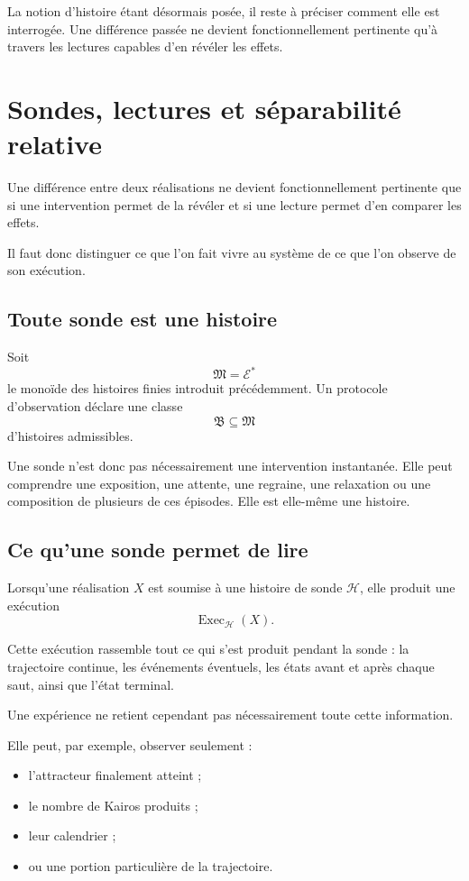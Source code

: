 La notion d'histoire étant désormais posée, il reste à préciser comment elle est interrogée. Une différence passée ne devient fonctionnellement pertinente qu'à travers les lectures capables d'en révéler les effets.

\section{Sondes, lectures et séparabilité relative}
\label{t3-sondes-lectures-separabilite}

Une différence entre deux réalisations ne devient fonctionnellement pertinente que si une intervention permet de la révéler et si une lecture permet d'en comparer les effets.

Il faut donc distinguer ce que l'on fait vivre au système de ce que l'on observe de son exécution.

\subsection{Toute sonde est une histoire}

Soit
\[
\mathfrak M=\mathcal E^\ast
\]
le monoïde des histoires finies introduit précédemment. Un protocole d'observation déclare une classe
\[
\mathfrak B\subseteq\mathfrak M
\]
d'histoires admissibles.

Une sonde n'est donc pas nécessairement une intervention instantanée. Elle peut comprendre une exposition, une attente, une regraine, une relaxation ou une composition de plusieurs de ces épisodes. Elle est elle-même une histoire.

\subsection{Ce qu'une sonde permet de lire}

Lorsqu'une réalisation $X$ est soumise à une histoire de sonde $\mathcal H$, elle produit une exécution
\[
\operatorname{Exec}_{\mathcal H}(X).
\]

Cette exécution rassemble tout ce qui s'est produit pendant la sonde : la trajectoire continue, les événements éventuels, les états avant et après chaque saut, ainsi que l'état terminal.

Une expérience ne retient cependant pas nécessairement toute cette information.

Elle peut, par exemple, observer seulement :

\begin{itemize}
\tightlist
\item
  l'attracteur finalement atteint ;
\item
  le nombre de Kairos produits ;
\item
  leur calendrier ;
\item
  ou une portion particulière de la trajectoire.
\end{itemize}

